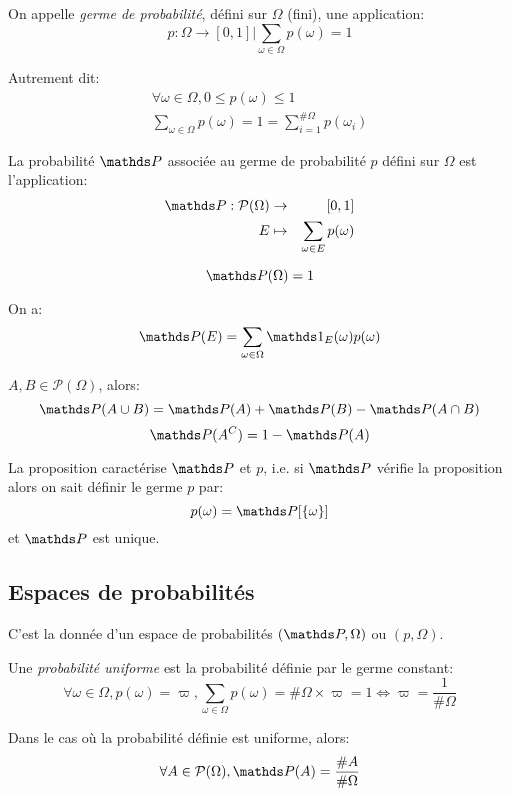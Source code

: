   \begin{definition}
    On appelle \emph{germe de probabilité}, défini sur $\Omega$ (fini), une
    application: \[
        p : \Omega \rightarrow [0,1] | \sum_{\omega\in\Omega} p(\omega) = 1
    \]
  \end{definition}

  Autrement dit: \begin{eqnarray*}
    \forall \omega \in \Omega, 0 \leq p(\omega) \leq 1\\
    \sum_{\omega\in\Omega} p(\omega) = 1 = \sum_{i=1}^{\#\Omega} p(\omega_i)
  \end{eqnarray*}


  \begin{definition}
    La probabilité $\PP$ associée au germe de probabilité $p$ défini sur $\Omega$
    est l'application: \begin{eqnarray*}
      \PP : \mathcal{P}(\Omega) &\rightarrow& [0,1]\\
                     E         &\mapsto& \sum_{\omega\in E} p(\omega)
  \end{eqnarray*}
  \end{definition}

  \begin{remarque}
    \[
      \PP(\Omega) = 1
    \]
  \end{remarque}

  \begin{remarque}
    On a:
    \[
      \PP(E) = \sum_{\omega\in\Omega} \indic_E(\omega) p(\omega)
    \]
  \end{remarque}

  \begin{proposition}
    $A, B \in \mathcal{P}(\Omega)$, alors:
    \[\PP(A\cup B) = \PP(A) + \PP(B) - \PP(A\cap B)\]
    \[\PP(A^C) = 1 - \PP(A)\]
  \end{proposition}

  \begin{remarque}
    La proposition caractérise $\PP$ et $p$, i.e. si $\PP$ vérifie la proposition
    alors on sait définir le germe $p$ par:
    \[
      p(\omega) = \PP[\{\omega\}]
    \]
    et $\PP$ est unique.
  \end{remarque}

  \subsection{Espaces de probabilités}
    C'est la donnée d'un espace de probabilités $(\PP, \Omega)$ ou $(p,\Omega)$.

    \begin{definition}
      Une \emph{probabilité uniforme} est la probabilité définie par le germe
      constant: \[
        \forall \omega \in \Omega, p(\omega) = \varpi,
        \sum_{\omega\in\Omega} p(\omega) = \#\Omega \times \varpi = 1 \iff \varpi = \frac{1}{\#\Omega}
      \]
    \end{definition}

    Dans le cas où la probabilité définie est uniforme, alors: \[
      \forall A\in\mathcal{P}(\Omega), \PP(A) = \frac{\#A}{\#\Omega}
    \]
